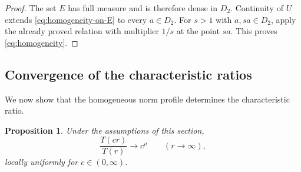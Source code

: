 \documentclass[12pt,letterpaper,reqno]{amsart}
\newtheorem{prop}[thm]{Proposition}
\theoremstyle{definition}
\numberwithin{equation}{section}
\begin{document}
\begin{proof}
The set \(E\) has full measure and is therefore dense in \(D_2\).
Continuity of \(U\) extends
\eqref{eq:homogeneity-on-E} to every \(a\in D_2\).
For \(s>1\) with \(a,sa\in D_2\), apply the already proved relation
with multiplier \(1/s\) at the point \(sa\). This proves
\eqref{eq:homogeneity}.
\end{proof}


\subsection{Convergence of the characteristic ratios}

We now show that the homogeneous norm profile determines the
characteristic ratio.

\begin{prop}\label{prop:regular-variation}
Under the assumptions of this section,
\begin{equation}\label{eq:ratio-limit}
 \frac{T(cr)}{T(r)}
 \longrightarrow
 c^\rho
 \qquad(r\to\infty),
\end{equation}
locally uniformly for \(c\in(0,\infty)\).
\end{prop}
\end{document}
